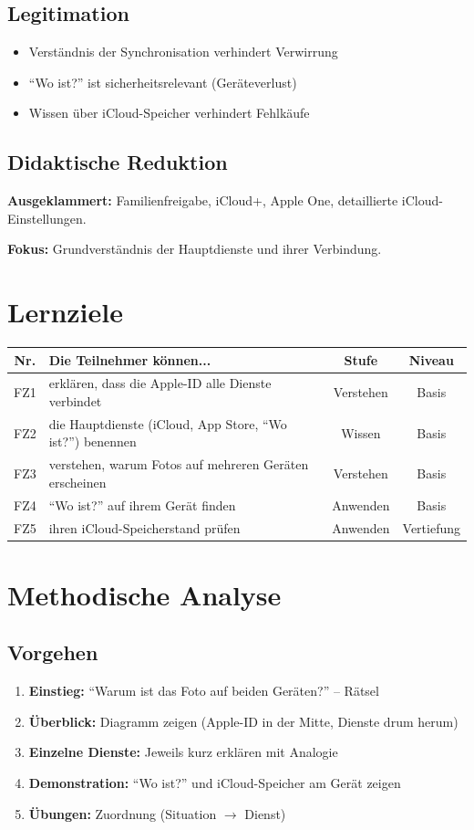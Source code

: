 \documentclass[11pt,a4paper]{article}
\begin{document}
\subsection{Legitimation}
\begin{itemize}
    \item Verständnis der Synchronisation verhindert Verwirrung
    \item ``Wo ist?'' ist sicherheitsrelevant (Geräteverlust)
    \item Wissen über iCloud-Speicher verhindert Fehlkäufe
\end{itemize}

\subsection{Didaktische Reduktion}
\textbf{Ausgeklammert:} Familienfreigabe, iCloud+, Apple One, detaillierte iCloud-Einstellungen.

\textbf{Fokus:} Grundverständnis der Hauptdienste und ihrer Verbindung.

\section{Lernziele}

\begin{tabular}{|c|p{7cm}|c|c|}
\hline
\textbf{Nr.} & \textbf{Die Teilnehmer können...} & \textbf{Stufe} & \textbf{Niveau} \\
\hline
FZ1 & erklären, dass die Apple-ID alle Dienste verbindet & Verstehen & Basis \\
FZ2 & die Hauptdienste (iCloud, App Store, ``Wo ist?'') benennen & Wissen & Basis \\
FZ3 & verstehen, warum Fotos auf mehreren Geräten erscheinen & Verstehen & Basis \\
FZ4 & ``Wo ist?'' auf ihrem Gerät finden & Anwenden & Basis \\
FZ5 & ihren iCloud-Speicherstand prüfen & Anwenden & Vertiefung \\
\hline
\end{tabular}

\section{Methodische Analyse}

\subsection{Vorgehen}
\begin{enumerate}
    \item \textbf{Einstieg:} ``Warum ist das Foto auf beiden Geräten?'' -- Rätsel
    \item \textbf{Überblick:} Diagramm zeigen (Apple-ID in der Mitte, Dienste drum herum)
    \item \textbf{Einzelne Dienste:} Jeweils kurz erklären mit Analogie
    \item \textbf{Demonstration:} ``Wo ist?'' und iCloud-Speicher am Gerät zeigen
    \item \textbf{Übungen:} Zuordnung (Situation $\rightarrow$ Dienst)
\end{enumerate}
\end{document}
